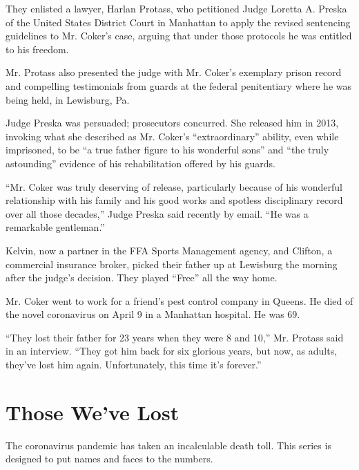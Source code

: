 They enlisted a lawyer, Harlan Protass, who petitioned Judge Loretta A.
Preska of the United States District Court in Manhattan to apply the
revised sentencing guidelines to Mr. Coker's case, arguing that under
those protocols he was entitled to his freedom.

Mr. Protass also presented the judge with Mr. Coker's exemplary prison
record and compelling testimonials from guards at the federal
penitentiary where he was being held, in Lewisburg, Pa.

Judge Preska was persuaded; prosecutors concurred. She released him in
2013, invoking what she described as Mr. Coker's ``extraordinary''
ability, even while imprisoned, to be ``a true father figure to his
wonderful sons'' and ``the truly astounding'' evidence of his
rehabilitation offered by his guards.

``Mr. Coker was truly deserving of release, particularly because of his
wonderful relationship with his family and his good works and spotless
disciplinary record over all those decades,'' Judge Preska said recently
by email. ``He was a remarkable gentleman.''

Kelvin, now a partner in the FFA Sports Management agency, and Clifton,
a commercial insurance broker, picked their father up at Lewisburg the
morning after the judge's decision. They played ``Free'' all the way
home.

Mr. Coker went to work for a friend's pest control company in Queens. He
died of the novel coronavirus on April 9 in a Manhattan hospital. He was
69.

``They lost their father for 23 years when they were 8 and 10,'' Mr.
Protass said in an interview. ``They got him back for six glorious
years, but now, as adults, they've lost him again. Unfortunately, this
time it's forever.''

\href{https://www.nytimes3xbfgragh.onion/interactive/2020/obituaries/people-died-coronavirus-obituaries.html?action=click\&pgtype=Article\&state=default\&region=BELOW_MAIN_CONTENT\&context=covid_obits_promo}{}

\hypertarget{those-weve-lost}{%
\section{Those We've Lost}\label{those-weve-lost}}

The coronavirus pandemic has taken an incalculable death toll. This
series is designed to put names and faces to the numbers.

